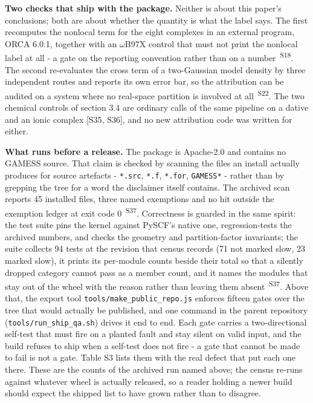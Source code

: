 \documentclass[11pt]{article}
\newcommand{\prov}[1]{\textsuperscript{\,#1}}
\begin{document}
\textbf{Two checks that ship with the package.} Neither is about this paper's conclusions; both are about whether the quantity is what the label says. The first recomputes the nonlocal term for the eight complexes in an external program, ORCA 6.0.1, together with an $\omega$B97X control that must not print the nonlocal label at all - a gate on the reporting convention rather than on a number \prov{S18}. The second re-evaluates the cross term of a two-Gaussian model density by three independent routes and reports its own error bar, so the attribution can be audited on a system where no real-space partition is involved at all \prov{S22}. The two chemical controls of section 3.4 are ordinary calls of the same pipeline on a dative and an ionic complex [S35, S36], and no new attribution code was written for either.

\textbf{What runs before a release.} The package is Apache-2.0 and contains no GAMESS source. That claim is checked by scanning the files an install actually produces for source artefacts - \texttt{*.src}, \texttt{*.f}, \texttt{*.for}, \texttt{GAMESS*} - rather than by grepping the tree for a word the disclaimer itself contains. The archived scan reports 45 installed files, three named exemptions and no hit outside the exemption ledger at exit code 0 \prov{S37}. Correctness is guarded in the same spirit: the test suite pins the kernel against PySCF's native one, regression-tests the archived numbers, and checks the geometry and partition-factor invariants; the suite collects 94 tests at the revision that census records (71 not marked slow, 23 marked slow), it prints its per-module counts beside their total so that a silently dropped category cannot pass as a member count, and it names the modules that stay out of the wheel with the reason rather than leaving them absent \prov{S37}. Above that, the export tool \texttt{tools/make\_public\_repo.js} enforces fifteen gates over the tree that would actually be published, and one command in the parent repository (\texttt{tools/run\_ship\_qa.sh}) drives it end to end. Each gate carries a two-directional self-test that must fire on a planted fault and stay silent on valid input, and the build refuses to ship when a self-test does not fire - a gate that cannot be made to fail is not a gate. Table S3 lists them with the real defect that put each one there. These are the counts of the archived run named above; the census re-runs against whatever wheel is actually released, so a reader holding a newer build should expect the shipped list to have grown rather than to disagree.
\end{document}
